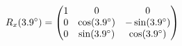 \documentclass[preview]{standalone}
\begin{document}
\begin{align*}
\special{dvisvgm:raw <g id='unique000'>}R_x(3.9^\circ) = \begin{pmatrix} 1 & 0 & 0 \\ 0 & \cos(3.9^\circ) & -\sin(3.9^\circ) \\ 0 & \sin(3.9^\circ) & \cos(3.9^\circ) \end{pmatrix}\special{dvisvgm:raw </g>}
\end{align*}
\end{document}
